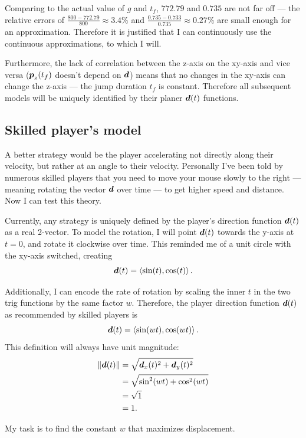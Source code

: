 Comparing to the actual value of $g$ and $t_f$, $772.79$ and $0.735$ are not far off --- the relative errors of $\frac{800 - 772.79}{800} \approx 3.4\%$ and $\frac{0.735-0.733}{0.735} \approx 0.27\%$ are small enough for an approximation. Therefore it is justified that I can continuously use the continuous approximations, to which I will.

Furthermore, the lack of correlation between the z-axis on the xy-axis and vice versa ($\boldsymbol{p}_z(t_f)$ doesn't depend on $\boldsymbol{d}$) means that no changes in the xy-axis can change the z-axis --- the jump duration $t_f$ is constant. Therefore all subsequent models will be uniquely identified by their planer $\boldsymbol{d}(t)$ functions.

\subsection{Skilled player's model}
A better strategy would be the player accelerating not directly along their velocity, but rather at an angle to their velocity. Personally I've been told by numerous skilled players that you need to move your mouse slowly to the right --- meaning rotating the vector $\boldsymbol{d}$ over time --- to get higher speed and distance. Now I can test this theory.

Currently, any strategy is uniquely defined by the player's direction function $\boldsymbol{d}(t)$ as a real 2-vector. To model the rotation, I will point $\boldsymbol{d}(t)$ towards the y-axis at $t=0$, and rotate it clockwise over time. This reminded me of a unit circle with the xy-axis switched, creating
\[
    \boldsymbol{d}(t) = \left\langle \sin(t), \cos(t) \right\rangle.
\]

Additionally, I can encode the rate of rotation by scaling the inner $t$ in the two trig functions by the same factor $w$. Therefore, the player direction function $\boldsymbol{d}(t)$ as recommended by skilled players is
\[
    \boldsymbol{d}(t) = \left\langle \sin(wt), \cos(wt) \right\rangle.
\]
This definition will always have unit magnitude:
\begin{align*}
    \|\boldsymbol{d}(t)\| &= \sqrt{\boldsymbol{d}_x(t)^2 + \boldsymbol{d}_y(t)^2}\\
    &= \sqrt{\sin^2(wt) + \cos^2(wt)}\\
    &= \sqrt{1}\\
    &= 1.
\end{align*}

My task is to find the constant $w$ that maximizes displacement.


